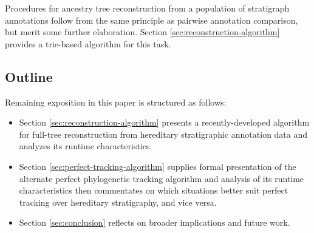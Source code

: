Procedures for ancestry tree reconstruction from a population of stratigraph annotations follow from the same principle as pairwise annotation comparison, but merit some further elaboration.
Section \ref{sec:reconstruction-algorithm} provides a trie-based algorithm for this task.

\subsection{Outline}

Remaining exposition in this paper is structured as follows:
\begin{itemize}
\item Section \ref{sec:reconstruction-algorithm} presents a recently-developed algorithm for full-tree reconstruction from hereditary stratigraphic annotation data and analyzes its runtime characteristics.
\item Section \ref{sec:perfect-tracking-algorithm} supplies formal presentation of the alternate perfect phylogenetic tracking algorithm and analysis of its runtime characteristics then commentates on which situations better suit perfect tracking over hereditary stratigraphy, and vice versa.
\item Section \ref{sec:conclusion} reflects on broader implications and future work.
\end{itemize}
